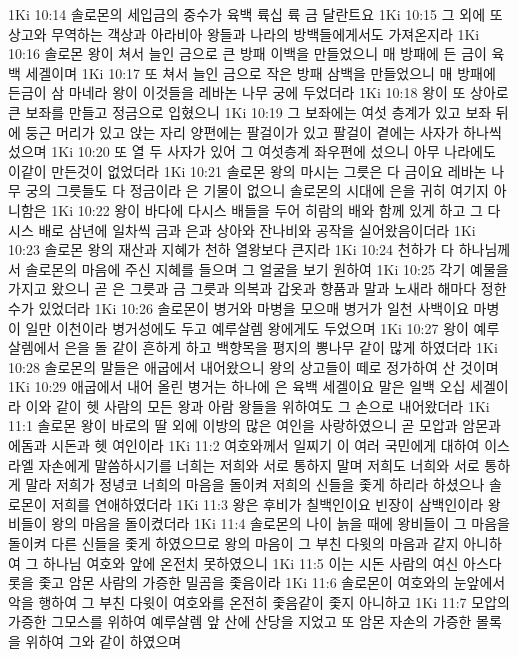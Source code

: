 1Ki 10:14  솔로몬의 세입금의 중수가 육백 륙십 륙 금 달란트요
1Ki 10:15  그 외에 또 상고와 무역하는 객상과 아라비아 왕들과 나라의 방백들에게서도 가져온지라
1Ki 10:16  솔로몬 왕이 쳐서 늘인 금으로 큰 방패 이백을 만들었으니 매 방패에 든 금이 육백 세겔이며
1Ki 10:17  또 쳐서 늘인 금으로 작은 방패 삼백을 만들었으니 매 방패에 든금이 삼 마네라 왕이 이것들을 레바논 나무 궁에 두었더라
1Ki 10:18  왕이 또 상아로 큰 보좌를 만들고 정금으로 입혔으니
1Ki 10:19  그 보좌에는 여섯 층계가 있고 보좌 뒤에 둥근 머리가 있고 앉는 자리 양편에는 팔걸이가 있고 팔걸이 곁에는 사자가 하나씩 섰으며
1Ki 10:20  또 열 두 사자가 있어 그 여섯층계 좌우편에 섰으니 아무 나라에도 이같이 만든것이 없었더라
1Ki 10:21  솔로몬 왕의 마시는 그릇은 다 금이요 레바논 나무 궁의 그릇들도 다 정금이라 은 기물이 없으니 솔로몬의 시대에 은을 귀히 여기지 아니함은
1Ki 10:22  왕이 바다에 다시스 배들을 두어 히람의 배와 함께 있게 하고 그 다시스 배로 삼년에 일차씩 금과 은과 상아와 잔나비와 공작을 실어왔음이더라
1Ki 10:23  솔로몬 왕의 재산과 지혜가 천하 열왕보다 큰지라
1Ki 10:24  천하가 다 하나님께서 솔로몬의 마음에 주신 지혜를 들으며 그 얼굴을 보기 원하여
1Ki 10:25  각기 예물을 가지고 왔으니 곧 은 그릇과 금 그릇과 의복과 갑옷과 향품과 말과 노새라 해마다 정한 수가 있었더라
1Ki 10:26  솔로몬이 병거와 마병을 모으매 병거가 일천 사백이요 마병이 일만 이천이라 병거성에도 두고 예루살렘 왕에게도 두었으며
1Ki 10:27  왕이 예루살렘에서 은을 돌 같이 흔하게 하고 백향목을 평지의 뽕나무 같이 많게 하였더라
1Ki 10:28  솔로몬의 말들은 애굽에서 내어왔으니 왕의 상고들이 떼로 정가하여 산 것이며
1Ki 10:29  애굽에서 내어 올린 병거는 하나에 은 육백 세겔이요 말은 일백 오십 세겔이라 이와 같이 헷 사람의 모든 왕과 아람 왕들을 위하여도 그 손으로 내어왔더라
1Ki 11:1  솔로몬 왕이 바로의 딸 외에 이방의 많은 여인을 사랑하였으니 곧 모압과 암몬과 에돔과 시돈과 헷 여인이라
1Ki 11:2  여호와께서 일찌기 이 여러 국민에게 대하여 이스라엘 자손에게 말씀하시기를 너희는 저희와 서로 통하지 말며 저희도 너희와 서로 통하게 말라 저희가 정녕코 너희의 마음을 돌이켜 저희의 신들을 좇게 하리라 하셨으나 솔로몬이 저희를 연애하였더라
1Ki 11:3  왕은 후비가 칠백인이요 빈장이 삼백인이라 왕비들이 왕의 마음을 돌이켰더라
1Ki 11:4  솔로몬의 나이 늙을 때에 왕비들이 그 마음을 돌이켜 다른 신들을 좇게 하였으므로 왕의 마음이 그 부친 다윗의 마음과 같지 아니하여 그 하나님 여호와 앞에 온전치 못하였으니
1Ki 11:5  이는 시돈 사람의 여신 아스다롯을 좇고 암몬 사람의 가증한 밀곰을 좇음이라
1Ki 11:6  솔로몬이 여호와의 눈앞에서 악을 행하여 그 부친 다윗이 여호와를 온전히 좇음같이 좇지 아니하고
1Ki 11:7  모압의 가증한 그모스를 위하여 예루살렘 앞 산에 산당을 지었고 또 암몬 자손의 가증한 몰록을 위하여 그와 같이 하였으며
